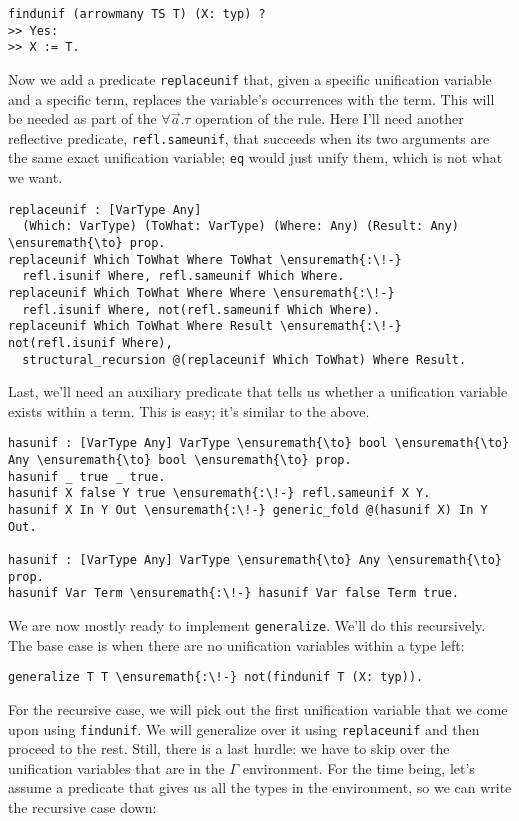 \begin{verbatim}
findunif (arrowmany TS T) (X: typ) ?
>> Yes:
>> X := T.
\end{verbatim}

Now we add a predicate \texttt{replaceunif} that, given a specific
unification variable and a specific term, replaces the variable's
occurrences with the term. This will be needed as part of the
\(\forall \vec{a}.\tau\) operation of the rule. Here I'll need another
reflective predicate, \texttt{refl.sameunif}, that succeeds when its two
arguments are the same exact unification variable; \texttt{eq} would
just unify them, which is not what we want.

\begin{verbatim}
replaceunif : [VarType Any]
  (Which: VarType) (ToWhat: VarType) (Where: Any) (Result: Any) \ensuremath{\to} prop.
replaceunif Which ToWhat Where ToWhat \ensuremath{:\!-}
  refl.isunif Where, refl.sameunif Which Where.
replaceunif Which ToWhat Where Where \ensuremath{:\!-}
  refl.isunif Where, not(refl.sameunif Which Where).
replaceunif Which ToWhat Where Result \ensuremath{:\!-} not(refl.isunif Where),
  structural_recursion @(replaceunif Which ToWhat) Where Result.
\end{verbatim}

Last, we'll need an auxiliary predicate that tells us whether a
unification variable exists within a term. This is easy; it's similar to
the above.

\begin{verbatim}
hasunif : [VarType Any] VarType \ensuremath{\to} bool \ensuremath{\to} Any \ensuremath{\to} bool \ensuremath{\to} prop.
hasunif _ true _ true.
hasunif X false Y true \ensuremath{:\!-} refl.sameunif X Y.
hasunif X In Y Out \ensuremath{:\!-} generic_fold @(hasunif X) In Y Out.

hasunif : [VarType Any] VarType \ensuremath{\to} Any \ensuremath{\to} prop.
hasunif Var Term \ensuremath{:\!-} hasunif Var false Term true.
\end{verbatim}

We are now mostly ready to implement \texttt{generalize}. We'll do this
recursively. The base case is when there are no unification variables
within a type left:

\begin{verbatim}
generalize T T \ensuremath{:\!-} not(findunif T (X: typ)).
\end{verbatim}

For the recursive case, we will pick out the first unification variable
that we come upon using \texttt{findunif}. We will generalize over it
using \texttt{replaceunif} and then proceed to the rest. Still, there is
a last hurdle: we have to skip over the unification variables that are
in the \(\Gamma\) environment. For the time being, let's assume a
predicate that gives us all the types in the environment, so we can
write the recursive case down:

